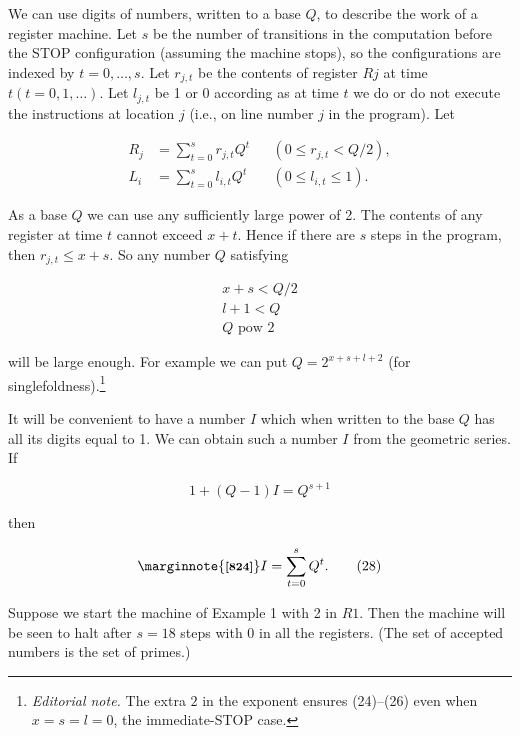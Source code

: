 \documentclass[11pt,leqno]{article}
\newcommand{\origpage}[1]{\marginnote{\footnotesize\textbf{[#1]}}}
\newcommand{\ednote}[1]{\footnote{\textit{Editorial note.} #1}}
\begin{document}
We can use digits of numbers, written to a base $Q$, to describe the work of a register machine. Let $s$ be the number of transitions in the computation before the STOP configuration (assuming the machine stops), so the configurations are indexed by $t=0,\ldots,s$. Let $r_{j, t}$ be the contents of register $R j$ at time $t(t=0,1, \ldots)$. Let $l_{j, t}$ be 1 or 0 according as at time $t$ we do or do not execute the instructions at location $j$ (i.e., on line number $j$ in the program). Let

\begin{align*}
R_j&=\sum_{t=0}^s r_{j,t}Q^t &&(0\leq r_{j,t}<Q/2), \tag{22}\label{eq:22}\\
L_i&=\sum_{t=0}^s l_{i,t}Q^t &&(0\leq l_{i,t}\leq1). \tag{23}\label{eq:23}
\end{align*}

As a base $Q$ we can use any sufficiently large power of 2. The contents of any register at time $t$ cannot exceed $x+t$. Hence if there are $s$ steps in the program, then $r_{j, t} \leq x+s$. So any number $Q$ satisfying

\begin{gather*}
x+s<Q / 2  \tag{24}\label{eq:24}\\
l+1<Q  \tag{25}\label{eq:25}\\
Q \text { pow } 2 \tag{26}\label{eq:26}
\end{gather*}

will be large enough. For example we can put $Q=2^{x+s+l+2}$ (for singlefoldness).\ednote{The extra $2$ in the exponent ensures (24)--(26) even when $x=s=l=0$, the immediate-STOP case.}

It will be convenient to have a number $I$ which when written to the base $Q$ has all its digits equal to 1. We can obtain such a number $I$ from the geometric series. If

\begin{equation*}
1+(Q-1) I=Q^{s+1} \tag{27}\label{eq:27}
\end{equation*}

then

\begin{equation*}
\origpage{824}I=\sum_{t=0}^{s} Q^{t} . \tag{28}\label{eq:28}
\end{equation*}

Suppose we start the machine of Example 1 with 2 in $R 1$. Then the machine will be seen to halt after $s=18$ steps with 0 in all the registers. (The set of accepted numbers is the set of primes.)
\end{document}
